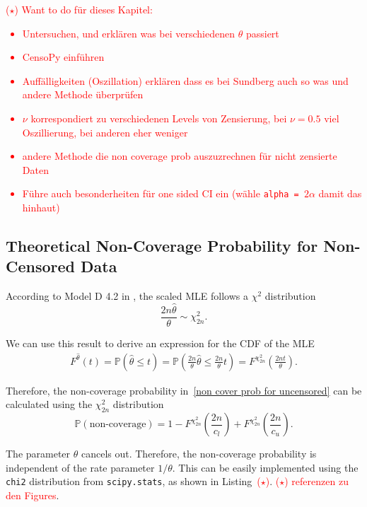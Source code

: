 \textcolor{red}{($\star$) Want to do für dieses Kapitel:
\begin{itemize}
	\item Untersuchen, und erklären was bei verschiedenen $\theta$ passiert \checkmark
	\item 
	CensoPy einführen
	\item Auffälligkeiten (Oszillation) erklären dass es bei Sundberg auch so was und andere Methode überprüfen
	\item $\nu$ korrespondiert zu verschiedenen Levels von Zensierung, bei $\nu = 0.5$ viel Oszillierung, bei anderen eher weniger
	\item andere Methode die non coverage prob auszuzrechnen für nicht zensierte Daten \checkmark
	\item 
	Führe auch besonderheiten für one sided CI ein (wähle \texttt{alpha = }$2 \alpha$ damit das hinhaut) \checkmark
\end{itemize}}

\subsection{Theoretical Non-Coverage Probability for Non-Censored Data}

According to Model D 4.2 in \cite{cramer2008grundlagen}, the scaled MLE follows a $\chi^2$ distribution
\[
\frac{2n \hat{\theta}}{\theta} \sim \chi^2_{2n}.
\]

We can use this result to derive an expression for the CDF of the MLE
\begin{align*}
	F^{\hat{\theta}} (t)
	=
	\mathbb{P} \left( \hat{\theta} \leq t \right)
	=
	\mathbb{P} \left( \frac{2n }{\theta} \hat{\theta} \leq \frac{2n}{\theta} t \right)
	=
	F^{\chi^2_{2n}} \left( \frac{2nt}{\theta} \right).
\end{align*}

Therefore, the non-coverage probability in~\eqref{non cover prob for uncensored} can be calculated using the $\chi^2_{2n}$ distribution
\begin{equation} \label{non coverage with chi sq}
\mathbb{P} \left( \text{non-coverage} \right)
=
1
- F^{\chi^2_{2n}} \left( \frac{2n}{c_l} \right)
+ F^{\chi^2_{2n}} \left( \frac{2n}{c_u} \right).
\end{equation}

The parameter $\theta$ cancels out. Therefore, the non-coverage probability is independent of the rate parameter $1/ \theta$.
This can be easily implemented using the \texttt{chi2} distribution from \texttt{scipy.stats}, as shown in Listing~\textcolor{red}{($\star$)}.
\textcolor{red}{($\star$) referenzen zu den Figures}.


